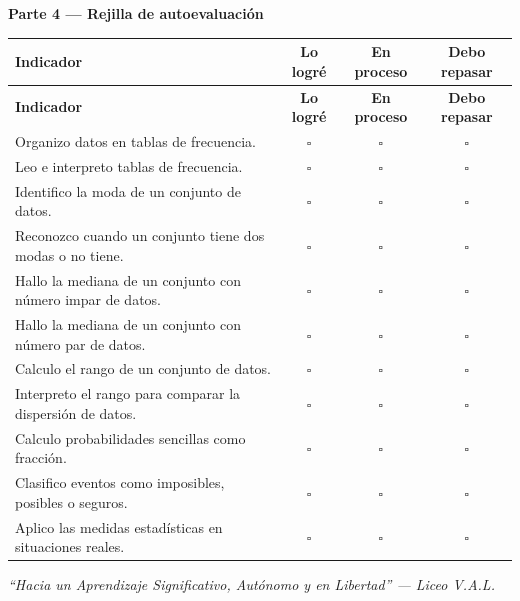 \documentclass[12pt, letterpaper]{article}
\begin{document}
	\noindent\textbf{Parte 4 — Rejilla de autoevaluación}
	
	\renewcommand{\arraystretch}{1.65}
	\begin{center}
		\begin{longtable}{|m{8.5cm}|c|c|c|}
			\hline
			\rowcolor{valdark!80}
			\color{white}\textbf{Indicador} &
			\color{white}\textbf{Lo logré} &
			\color{white}\textbf{En proceso} &
			\color{white}\textbf{Debo repasar} \\
			\hline
			\endfirsthead
			\hline
			\rowcolor{valdark!80}
			\color{white}\textbf{Indicador} &
			\color{white}\textbf{Lo logré} &
			\color{white}\textbf{En proceso} &
			\color{white}\textbf{Debo repasar} \\
			\hline
			\endhead
			\hline
			\endlastfoot
			Organizo datos en tablas de frecuencia.
			& $\square$ & $\square$ & $\square$ \\
			\hline
			Leo e interpreto tablas de frecuencia.
			& $\square$ & $\square$ & $\square$ \\
			\hline
			Identifico la moda de un conjunto de datos.
			& $\square$ & $\square$ & $\square$ \\
			\hline
			Reconozco cuando un conjunto tiene dos modas o no tiene.
			& $\square$ & $\square$ & $\square$ \\
			\hline
			Hallo la mediana de un conjunto con número impar de datos.
			& $\square$ & $\square$ & $\square$ \\
			\hline
			Hallo la mediana de un conjunto con número par de datos.
			& $\square$ & $\square$ & $\square$ \\
			\hline
			Calculo el rango de un conjunto de datos.
			& $\square$ & $\square$ & $\square$ \\
			\hline
			Interpreto el rango para comparar la dispersión de datos.
			& $\square$ & $\square$ & $\square$ \\
			\hline
			Calculo probabilidades sencillas como fracción.
			& $\square$ & $\square$ & $\square$ \\
			\hline
			Clasifico eventos como imposibles, posibles o seguros.
			& $\square$ & $\square$ & $\square$ \\
			\hline
			Aplico las medidas estadísticas en situaciones reales.
			& $\square$ & $\square$ & $\square$ \\
			\hline
		\end{longtable}
	\end{center}
	
	\begin{center}
		\begin{tcolorbox}[colback=valblue!10, colframe=valblue,
			width=0.75\textwidth, arc=3mm, boxrule=1.5pt]
			\centering\itshape
			``Hacia un Aprendizaje Significativo,
			Autónomo y en Libertad'' --- Liceo V.A.L.
		\end{tcolorbox}
	\end{center}
	
\end{document}
